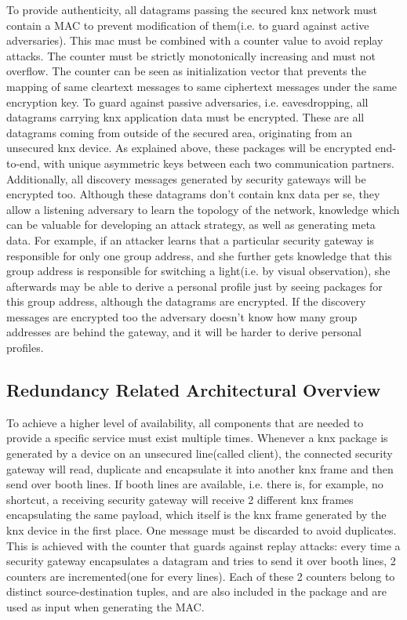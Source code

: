 To provide authenticity, all datagrams passing the secured knx network must contain a MAC to prevent modification of them(i.e. to guard against active
adversaries). This mac must be combined with a counter value to avoid replay attacks. The counter must be strictly monotonically increasing and must not overflow.
The counter can be seen as initialization vector that prevents the mapping of same cleartext messages to same ciphertext messages under the same
encryption key.
To guard against passive adversaries, i.e. eavesdropping, all datagrams carrying knx application data must be encrypted. These are all datagrams coming from outside of the
secured area, originating from an unsecured knx device. As explained above, these packages will be encrypted end-to-end, with unique asymmetric keys between
each two communication partners.
Additionally, all discovery messages generated by security gateways will be encrypted too. Although these datagrams don't contain knx data per se, they allow
a listening adversary to learn the topology of the network, knowledge which can be valuable for developing an attack strategy, as well as generating meta data.
For example, if an attacker learns that a particular security gateway is responsible for only one group address, and she further gets knowledge that this 
group address is responsible for switching a light(i.e. by visual observation), she afterwards may be able to derive a personal profile just by seeing
packages for this group address, although the datagrams are encrypted. If the discovery messages are encrypted too the adversary doesn't know how many
group addresses are behind the gateway, and it will be harder to derive personal profiles.

\subsection{Redundancy Related Architectural Overview}

To achieve a higher level of availability, all components that are needed to provide a specific service must exist multiple times. Whenever a knx package is
generated by a device on an unsecured line(called client), the connected security gateway will read, duplicate and encapsulate it into another knx frame and then send over booth lines.
If booth lines are available, i.e. there is, for example, no shortcut, a receiving security gateway will receive 2 different knx frames encapsulating the same
payload, which itself is the knx frame generated by the knx device in the first place. One message must be discarded to avoid duplicates. This is 
achieved with the counter that guards against replay attacks: every time a security gateway encapsulates a datagram and tries to send it over booth lines,
2 counters are incremented(one for every lines). Each of these 2 counters belong to distinct source-destination tuples, and are also included in the package and
are used as input when generating the MAC.

